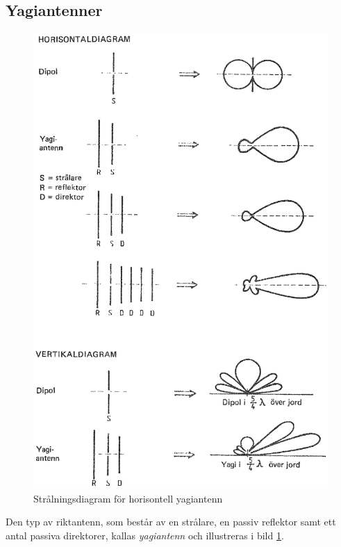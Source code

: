 \subsection{Yagiantenner}

\begin{figure}
  \includegraphics[width=\textwidth]{images/cropped_pdfs/bild_2_6-20.pdf}
  \caption{Strålningsdiagram för horisontell yagiantenn}
  \label{fig:bildII6-20}
\end{figure}

Den typ av riktantenn, som består av en strålare, en passiv reflektor
samt ett antal passiva direktorer, kallas \emph{yagiantenn} och illustreras i
bild \ref{fig:bildII6-20}.

